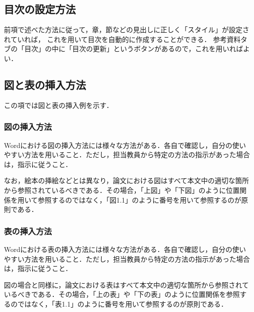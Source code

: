 \subsection{目次の設定方法}
前項で述べた方法に従って，章，節などの見出しに正しく「スタイル」が設定されていれば，
これを用いて目次を自動的に作成することができる．
参考資料タブの「目次」の中に「目次の更新」というボタンがあるので，これを用いればよい．

\subsection{図と表の挿入方法}
この項では図と表の挿入例を示す．

\subsubsection{図の挿入方法}
Wordにおける図の挿入方法には様々な方法がある．各自で確認し，自分の使いやすい方法を用いること．ただし，担当教員から特定の方法の指示があった場合は，指示に従うこと．

なお，絵本の挿絵などとは異なり，論文における図はすべて本文中の適切な箇所から参照されているべきである．その場合，「上図」や「下図」のように位置関係を用いて参照するのではなく，「図1.1」のように番号を用いて参照するのが原則である．


\subsubsection{表の挿入方法}
Wordにおける表の挿入方法には様々な方法がある．各自で確認し，自分の使いやすい方法を用いること．ただし，担当教員から特定の方法の指示があった場合は，指示に従うこと．

図の場合と同様に，論文における表はすべて本文中の適切な箇所から参照されているべきである．その場合，「上の表」や「下の表」のように位置関係を参照するのではなく，「表1.1」のように番号を用いて参照するのが原則である．


